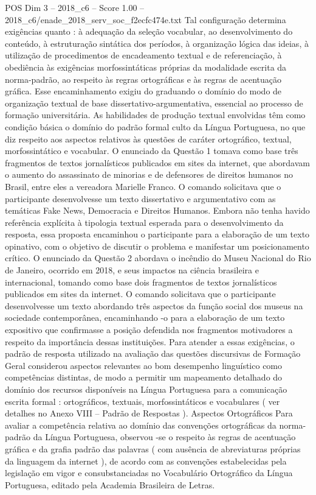 \begin{textsample}{POS Dim 3 – 2018\_c6 – Score 1.00 – 2018\_c6/enade\_2018\_serv\_soc\_f2ecfc474e.txt}
Tal configuração determina exigências quanto : à adequação da seleção vocabular, ao desenvolvimento do conteúdo, à estruturação sintática dos períodos, à organização lógica das ideias, à utilização de procedimentos de encadeamento textual e de referenciação, à obediência às exigências morfossintáticas próprias da modalidade escrita da norma-padrão, ao respeito às regras ortográficas e às regras de acentuação gráfica.
Esse encaminhamento exigiu do graduando o domínio do modo de organização textual de base dissertativo-argumentativa, essencial ao processo de formação universitária.
As habilidades de produção textual envolvidas têm como condição básica o domínio do padrão formal culto da Língua Portuguesa, no que diz respeito aos aspectos relativos às questões de caráter ortográfico, textual, morfossintático e vocabular.
O enunciado da Questão 1 tomava como base três fragmentos de textos jornalísticos publicados em sites da internet, que abordavam o aumento do assassinato de minorias e de defensores de direitos humanos no Brasil, entre eles a vereadora Marielle Franco.
O comando solicitava que o participante desenvolvesse um texto dissertativo e argumentativo com as temáticas Fake News, Democracia e Direitos Humanos.
Embora não tenha havido referência explícita à tipologia textual esperada para o desenvolvimento da resposta, essa proposta encaminhou o participante para a elaboração de um texto opinativo, com o objetivo de discutir o problema e manifestar um posicionamento crítico.
O enunciado da Questão 2 abordava o incêndio do Museu Nacional do Rio de Janeiro, ocorrido em 2018, e seus impactos na ciência brasileira e internacional, tomando como base dois fragmentos de textos jornalísticos publicados em sites da internet.
O comando solicitava que o participante desenvolvesse um texto abordando três aspectos da função social dos museus na sociedade contemporânea, encaminhando -o para a elaboração de um texto expositivo que confirmasse a posição defendida nos fragmentos motivadores a respeito da importância dessas instituições.
Para atender a essas exigências, o padrão de resposta utilizado na avaliação das questões discursivas de Formação Geral considerou aspectos relevantes ao bom desempenho linguístico como competências distintas, de modo a permitir um mapeamento detalhado do domínio dos recursos disponíveis na Língua Portuguesa para a comunicação escrita formal : ortográficos, textuais, morfossintáticos e vocabulares ( ver detalhes no Anexo VIII – Padrão de Respostas ).
Aspectos Ortográficos Para avaliar a competência relativa ao domínio das convenções ortográficas da norma-padrão da Língua Portuguesa, observou -se o respeito às regras de acentuação gráfica e da grafia padrão das palavras ( com ausência de abreviaturas próprias da linguagem da internet ), de acordo com as convenções estabelecidas pela legislação em vigor e consubstanciadas no Vocabulário Ortográfico da Língua Portuguesa, editado pela Academia Brasileira de Letras.

\end{textsample}
